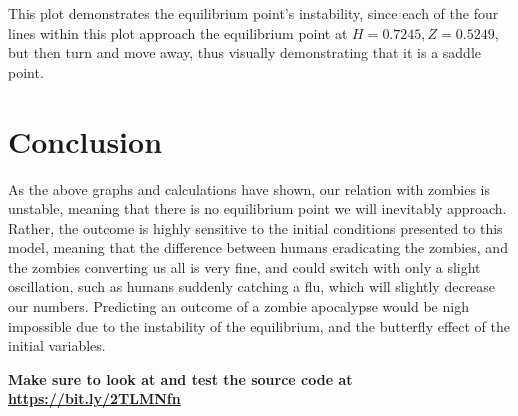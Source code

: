 \documentclass[11pt]{article}
\begin{document}
This plot demonstrates the equilibrium point's instability, since each of the four lines within this plot approach the equilibrium point at $H = 0.7245, Z = 0.5249$, but then turn and move away, thus visually demonstrating that it is a saddle point.

\section{Conclusion}

As the above graphs and calculations have shown, our relation with zombies is unstable, meaning that there is no equilibrium point we will inevitably approach. Rather, the outcome is highly sensitive to the initial conditions presented to this model, meaning that the difference between humans eradicating the zombies, and the zombies converting us all is very fine, and could switch with only a slight oscillation, such as humans suddenly catching a flu, which will slightly decrease our numbers. Predicting an outcome of a zombie apocalypse would be nigh impossible due to the instability of the equilibrium, and the butterfly effect of the initial variables.

\textbf{Make sure to look at and test the source code at \href{https://bit.ly/2TLMNfn}{https://bit.ly/2TLMNfn}}
\end{document}
